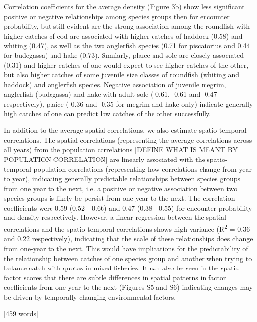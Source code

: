 \documentclass{nature}
\begin{document}
\begin{linenumbers}
Correlation coefficients for the average density (Figure 3b) show less
significant positive or negative relationships among species groups then for
encounter probability, but still evident are the strong association among the
roundfish with higher catches of cod are associated with higher catches of
haddock (0.58) and whiting (0.47), as well as the two anglerfish species (0.71
for piscatorius and 0.44 for budegassa) and hake (0.73). Similarly, plaice and
sole are closely associated (0.31) and higher catches of one would expect to
see higher catches of the other, but also higher catches of some juvenile size
classes of roundfish (whiting and haddock) and anglerfish species. Negative
association of juvenile megrim, anglerfish (budegassa) and hake with adult sole
(-0.61, -0.61 and -0.47 respectively), plaice (-0.36 and -0.35 for megrim and
hake only) indicate generally high catches of one can predict low catches of
the other successfully.

In addition to the average spatial correlations, we also estimate
spatio-temporal correlations.  The spatial correlations (representing the
average correlations across all years) from the population correlations [DEFINE WHAT IS MEANT BY POPULATION CORRELATION] are
linearly associated with the spatio-temporal population correlations
(representing how correlations change from year to year), indicating generally
predictable relationships between species groups from one year to the next,
i.e. a positive or negative association between two species groups is likely be
persist from one year to the next. The correlation coefficients were 0.59 (0.52
- 0.66) and 0.47 (0.38 - 0.55) for encounter probability and density
respectively.  However, a linear regression between the spatial correlations
and the spatio-temporal correlations shows high variance (R\textsuperscript{2}
= 0.36 and 0.22 respectively), indicating that the scale of these relationships
does change from one-year to the next. This would have implications for the
predictability of the relationship between catches of one species group and
another when trying to balance catch with quotas in mixed fisheries. It can
also be seen in the spatial factor scores that there are subtle differences in
spatial patterns in factor coefficients from one year to the next (Figures S5
and S6) indicating changes may be driven by temporally changing environmental
factors.

[459 words]



\end{linenumbers}
\end{document}

